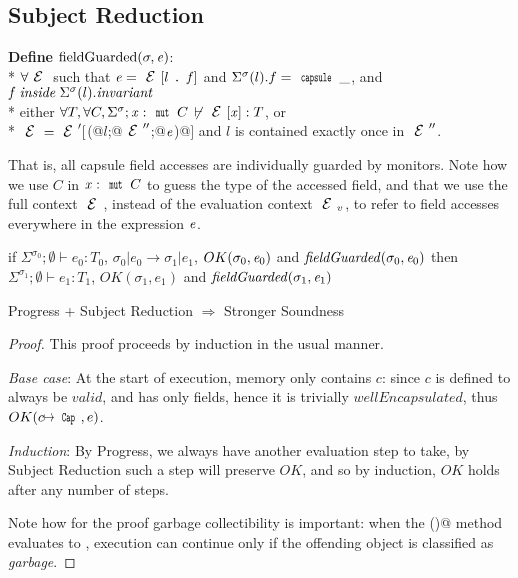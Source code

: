 \subsection{Subject Reduction}

\noindent\textbf{Define} $\text{fieldGuarded}(\sigma,\e)$:\\*
\indent$\forall \ctx$ such that $\e=\ctx[l\singleDot\f] $
and $\Sigma^\sigma(l).f=\Kw{capsule}\,\_$, and $\f\mathrel{\mathit{inside}} \Sigma^\sigma(l).\mathit{invariant}$\\*
\indent\indent either
$\forall T, \forall C, \Sigma^\sigma;\x:\Kw{mut}\,C\,\not\vdash\ctx[\x]:T$, or\\*
\indent\indent $\ctx=\ctx'[$\Q@M(@$l$\Q@;@$\ctx''$\Q@;@${\mathit{e}}$\Q@)@$]$ and $l$ is contained exactly once in $\ctx''$.

That is, all \Q@mut@ capsule field accesses are individually guarded by monitors.
Note how we use $C$ in $\x:\Kw{mut}\,C$ to guess the type of the accessed field,
and that we use the full context $\ctx$, instead of the evaluation context $\ctx_v$,
to refer to field accesses everywhere in the expression ${\mathit{e}}$.


\begin{theorem}
if $\Sigma^{\sigma_0};\emptyset\vdash e_0: T_0$,
$\sigma_0|e_0\rightarrow \sigma_1|e_1$,
$OK(\sigma_0,\e_0)$
and
$\mathit{fieldGuarded}(\sigma_0,\e_0)$
then
$\Sigma^{\sigma_1};\emptyset\vdash e_1: T_1$,
$OK(\sigma_1,e_1)$ and
$\mathit{fieldGuarded}(\sigma_1,\e_1)$
\end{theorem}

\begin{theorem}
	Progress + Subject Reduction $\Rightarrow$ Stronger Soundness
\end{theorem}
\begin{proof}
This proof proceeds by induction in the usual manner.

\emph{Base case}: At the start of execution, memory only contains $c$: since $c$ is defined to always be $\mathit{valid}$, and has only \Q@mut@ fields, hence it is trivially $\mathit{wellEncapsulated}$, thus $OK(c\mapsto\Kw{Cap},e)$.

\emph{Induction}: By Progress, we always have another evaluation step to take, by Subject Reduction such a step will preserve $\mathit{OK}$, and so by induction, $\mathit{OK}$ holds after any number of steps.

Note how for the proof garbage collectibility is important:
when the \Q@invariant()@ method evaluates to \Q@false@,
execution can continue only if the offending object is classified as \emph{garbage}.
\end{proof}

